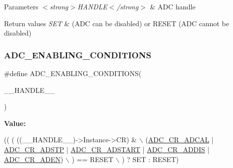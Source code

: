 \begin{DoxyParams}{Parameters}
{\em $<$strong$>$\+H\+A\+N\+D\+L\+E$<$/strong$>$} & A\+DC handle \\
\hline
\end{DoxyParams}

\begin{DoxyRetVals}{Return values}
{\em S\+ET} & (A\+DC can be disabled) or R\+E\+S\+ET (A\+DC cannot be disabled) \\
\hline
\end{DoxyRetVals}
\mbox{\label{group___a_d_c___private___macros_ga659ecd034552504fc163da87bad15ddc}} 
\subsubsection{\texorpdfstring{A\+D\+C\+\_\+\+E\+N\+A\+B\+L\+I\+N\+G\+\_\+\+C\+O\+N\+D\+I\+T\+I\+O\+NS}{ADC\_ENABLING\_CONDITIONS}}
{\footnotesize\ttfamily \#define A\+D\+C\+\_\+\+E\+N\+A\+B\+L\+I\+N\+G\+\_\+\+C\+O\+N\+D\+I\+T\+I\+O\+NS(\begin{DoxyParamCaption}\item[{}]{\+\_\+\+\_\+\+H\+A\+N\+D\+L\+E\+\_\+\+\_\+ }\end{DoxyParamCaption})}

{\bfseries Value\+:}
\begin{DoxyCode}
(( ( ((\_\_HANDLE\_\_)->Instance->CR) &                                              \(\backslash\)
       (\hyperlink{group___peripheral___registers___bits___definition_ga87c66f671af3241a20d7dfa2a048b40a}{ADC\_CR\_ADCAL} | \hyperlink{group___peripheral___registers___bits___definition_ga56c924ba75bdb8b75aa9130b75effbe5}{ADC\_CR\_ADSTP} | \hyperlink{group___peripheral___registers___bits___definition_ga25021284fb6bfad3e8448edc6ef81218}{ADC\_CR\_ADSTART} | 
      \hyperlink{group___peripheral___registers___bits___definition_gad99494f414a25f32a5f00ea39ea2150a}{ADC\_CR\_ADDIS} | \hyperlink{group___peripheral___registers___bits___definition_ga26fe09dfd6969dd95591942e80cc3d2b}{ADC\_CR\_ADEN}) \(\backslash\)
      ) == RESET                                                                   \(\backslash\)
   ) ? SET : RESET)
\end{DoxyCode}


